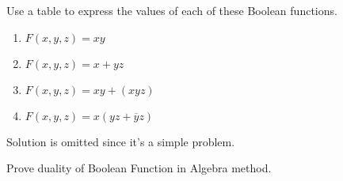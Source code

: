     \begin{exercise}
        Use a table to express the values of each of these Boolean functions.
        \begin{enumerate}[label=\alph*)]
            \item $F(x, y, z) = xy$
            \item $F(x, y, z) = x + yz$
            \item $F(x, y, z) = xy + (xyz)$
            \item $F(x, y, z) = x(yz + \overline{y}z)$
        \end{enumerate}
            Solution is omitted since it's a simple problem.
    \end{exercise}

    \begin{exercise}
        Prove duality of Boolean Function in Algebra method.
    \end{exercise}
